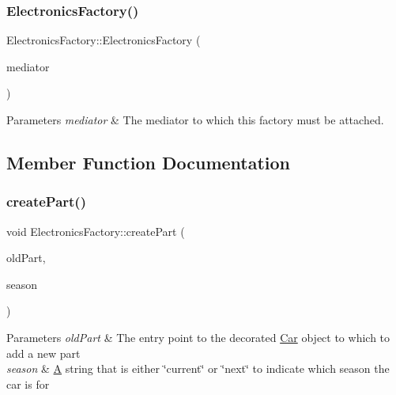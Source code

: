\subsubsection{\texorpdfstring{Electronics\+Factory()}{ElectronicsFactory()}}
{\footnotesize\ttfamily Electronics\+Factory\+::\+Electronics\+Factory (\begin{DoxyParamCaption}\item[{\hyperlink{classDepartmentMediator}{Department\+Mediator} $\ast$}]{mediator }\end{DoxyParamCaption})}


\begin{DoxyParams}{Parameters}
{\em mediator} & The mediator to which this factory must be attached. \\
\hline
\end{DoxyParams}


\subsection{Member Function Documentation}
\mbox{\label{classElectronicsFactory_a6489d0e612615f65d76620585a67ff38}} 
\subsubsection{\texorpdfstring{create\+Part()}{createPart()}}
{\footnotesize\ttfamily void Electronics\+Factory\+::create\+Part (\begin{DoxyParamCaption}\item[{\hyperlink{classDepartmentOutput}{Department\+Output} $\ast$}]{old\+Part,  }\item[{string}]{season }\end{DoxyParamCaption})\hspace{0.3cm}{\ttfamily [virtual]}}


\begin{DoxyParams}{Parameters}
{\em old\+Part} & The entry point to the decorated \hyperlink{classCar}{Car} object to which to add a new part \\
\hline
{\em season} & \hyperlink{classA}{A} string that is either \char`\"{}current\char`\"{} or \char`\"{}next\char`\"{} to indicate which season the car is for \\
\hline
\end{DoxyParams}


